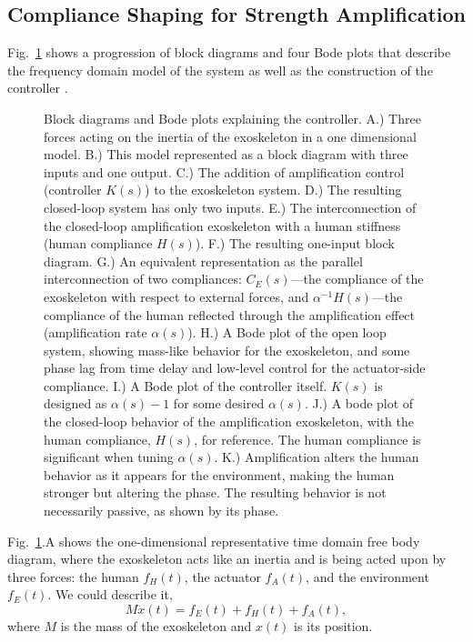 \subsection{Compliance Shaping for Strength Amplification}
Fig.~\ref{fig:block_diagrams} shows a progression of block diagrams and four Bode plots that describe the frequency domain model of the system as well as the construction of the controller .

\begin{figure}[t]
	\def\svgwidth{\textwidth}
	{%
		}
	\caption{Block diagrams and Bode plots explaining the controller. A.) Three forces acting on the inertia of the exoskeleton in a one dimensional model. B.) This model represented as a block diagram with three inputs and one output. C.) The addition of amplification control (controller $K(s)$) to the exoskeleton system. D.) The resulting closed-loop system has only two inputs. E.) The interconnection of the closed-loop amplification exoskeleton with a human stiffness (human compliance $H(s)$). F.) The resulting one-input block diagram. G.) An equivalent representation as the parallel interconnection of two compliances: $C_E(s)$---the compliance of the exoskeleton with respect to external forces, and $\alpha^{-1}H(s)$---the compliance of the human reflected through the amplification effect (amplification rate $\alpha(s)$). H.) A Bode plot of the open loop system, showing mass-like behavior for the exoskeleton, and some phase lag from time delay and low-level control for the actuator-side compliance. I.) A Bode plot of the controller itself. $K(s)$ is designed as $\alpha(s)-1$ for some desired $\alpha(s)$. J.) A bode plot of the closed-loop behavior of the amplification exoskeleton, with the human compliance, $H(s)$, for reference. The human compliance is significant when tuning $\alpha(s)$. K.) Amplification alters the human behavior as it appears for the environment, making the human stronger but altering the phase. The resulting behavior is not necessarily passive, as shown by its phase. }\label{fig:block_diagrams}
\end{figure}


Fig.~\ref{fig:block_diagrams}.A shows the one-dimensional representative time domain free body diagram, where the exoskeleton acts like an inertia and is being acted upon by three forces: the human $f_H(t)$, the actuator $f_A(t)$, and the environment $f_E(t)$. We could describe it,
\begin{equation}
M \ddot x(t) = f_E(t)+f_H(t)+f_A(t),
\end{equation}
where $M$ is the mass of the exoskeleton and $x(t)$ is its position.

